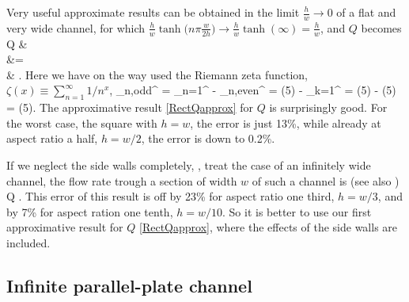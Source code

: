Very useful approximate results can be obtained in the limit
$\frac{h}{w}\rightarrow 0$ of a flat and very wide channel, for
which $\frac{h}{w} \tanh\big(n\pi\frac{w}{2h}\big) \rightarrow
\frac{h}{w}\tanh(\infty) = \frac{h}{w}$, and $Q$ becomes
%
 \bal
 Q
 &\approx {}\:
  \nn\\
 &= \:
  \nn\\
 &\approx {}\:
 .
 \eal
%
Here we have on the way used the Riemann zeta
function, $\zeta(x) \equiv
\sum_{n=1}^{\infty} 1/n^x$,
%
 \sum_{n,\textrm{odd}}^\infty {}
 = \sum_{n=1}^\infty {} -
 \sum_{n,\textrm{even}}^\infty {}
 = \zeta(5) - \sum_{k=1}^\infty {}
 = \zeta(5) - \:\zeta(5) = \:\zeta(5).
 \eeq
%
The approximative result \eqref{RectQapprox} for $Q$ is
surprisingly good. For the worst case, the square with $h=w$, the
error is just 13\%, while already at aspect ratio a half, $h=w/2$,
the error is down to 0.2\%.

If we neglect the side walls completely, \ie, treat the case of an
infinitely wide channel, the flow rate trough a section of width
$w$ of such a channel is (see also )
%
 Q \approx {}.
 \eeq
%
This error of this result is off by 23\% for aspect ratio one
third, $h=w/3$, and by 7\% for aspect ration one tenth, $h=w/10$.
So it is better to use our first approximative result for $Q$
\eqref{RectQapprox}, where the effects of the side walls are
included.


\subsection{Infinite parallel-plate channel}


